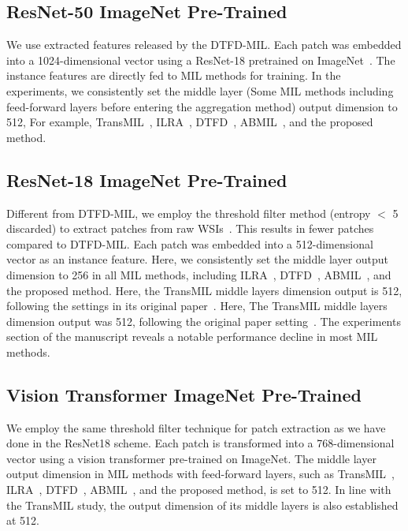 \subsection{ResNet-50 ImageNet Pre-Trained}
We use extracted features released by the DTFD-MIL. Each patch was embedded into a 1024-dimensional vector using a ResNet-18 pretrained on ImageNet~\cite{resnet}. The instance features are directly fed to MIL methods for training. In the experiments, we consistently set the middle layer (Some MIL methods including feed-forward layers before entering the aggregation method) output dimension to 512, For example, TransMIL~\cite{shao2021transmil},  ILRA~\cite{lowrankmil}, DTFD~\cite{zhang2022dtfd}, ABMIL~\cite{ilse2018attention}, and the proposed method.

\subsection{ResNet-18 ImageNet Pre-Trained}
\label{resnet18}
Different from DTFD-MIL, we employ the threshold filter method (entropy $<$ 5 discarded) to extract patches from raw WSIs~\cite{li2021dual}.  This results in fewer patches compared to DTFD-MIL. Each patch was embedded into a 512-dimensional vector as an instance feature. Here, we consistently set the middle layer output dimension to 256 in all MIL methods, including ILRA~\cite{lowrankmil}, DTFD~\cite{zhang2022dtfd}, ABMIL~\cite{ilse2018attention}, and the proposed method. Here, the TransMIL middle layers dimension output is 512, following the settings in its original paper~\cite{shao2021transmil}. Here, The TransMIL middle layers dimension output was 512, following the original paper setting~\cite{shao2021transmil}. The experiments section of the manuscript reveals a notable performance decline in most MIL methods. 

\subsection{Vision Transformer ImageNet Pre-Trained}
We employ the same threshold filter technique for patch extraction as we have done in the ResNet18 scheme. Each patch is transformed into a 768-dimensional vector using a vision transformer pre-trained on ImageNet. The middle layer output dimension in MIL methods with feed-forward layers, such as TransMIL~\cite{shao2021transmil}, ILRA~\cite{lowrankmil}, DTFD~\cite{zhang2022dtfd}, ABMIL~\cite{ilse2018attention}, and the proposed method, is set to 512. In line with the TransMIL study, the output dimension of its middle layers is also established at 512.

